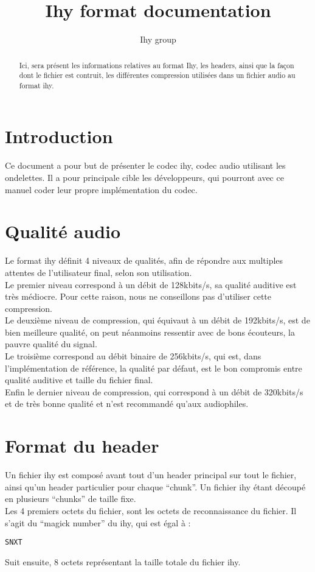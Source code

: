 \documentclass[a4paper,12pt]{article}
\title{Ihy format documentation}
\author{Ihy group}
\begin{document}
\maketitle

\begin{abstract}
Ici, sera présent les informations relatives au format Ihy, les headers, ainsi
que la façon dont le fichier est contruit, les différentes compression
utilisées dans un fichier audio au format ihy.
\end{abstract}

\tableofcontents

\section{Introduction}
Ce document a pour but de présenter le codec ihy, codec audio utilisant les
ondelettes. Il a pour principale cible les développeurs, qui pourront avec ce
manuel coder leur propre implémentation du codec.

\section{Qualité audio}
Le format ihy définit 4 niveaux de qualités, afin de répondre aux multiples
attentes de l'utilisateur final, selon son utilisation.\\
Le premier niveau correspond à un débit de 128kbits/s, sa qualité auditive est
très médiocre. Pour cette raison, nous ne conseillons pas d'utiliser cette
compression.\\
Le deuxième niveau de compression, qui équivaut à un débit de 192kbits/s, est de
bien meilleure qualité, on peut néanmoins ressentir avec de bons écouteurs, la
pauvre qualité du signal.\\
Le troisième correspond au débit binaire de 256kbits/s, qui est, dans
l'implémentation de référence, la qualité par défaut, est le bon compromis entre
qualité auditive et taille du fichier final.\\
Enfin le dernier niveau de compression, qui correspond à un débit de 320kbits/s
et de très bonne qualité et n'est recommandé qu'aux audiophiles.

\section{Format du header}
Un fichier ihy est composé avant tout d'un header principal sur tout le fichier,
ainsi qu'un header particulier pour chaque ``chunk''. Un fichier ihy étant
découpé en plusieurs ``chunks'' de taille fixe.\\
Les 4 premiers octets du fichier, sont les octets de reconnaissance du fichier.
Il s'agit du ``magick number'' du ihy, qui est égal à :
\begin{lstlisting}[frame=single]
SNXT
\end{lstlisting}
Suit ensuite, 8 octets représentant la taille totale du fichier ihy.
\end{document}
